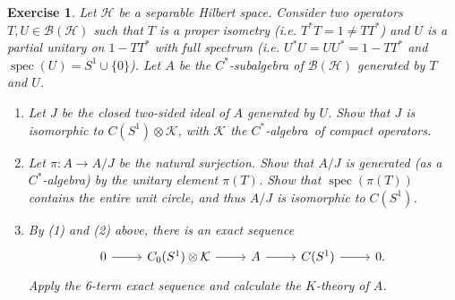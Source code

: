 \documentclass{book}
\newtheorem{exercise}{Exercise}[section]
\def\cstar{\(C^*\)-algebra}
\begin{document}
\begin{exercise}\label{ex:8412}
  Let \(\mathcal{H}\) be a separable Hilbert space. Consider two operators \(T,U\in\mathcal{B}(\mathcal{H})\)
  such that \(T\) is a proper isometry (i.e. \(T^* T=1\neq T T^*\)) and \(U\) is a partial unitary on \(1-T T^*\)
  with full spectrum (i.e. \(U^* U=U U^*=1-T T^*\) and \(\operatorname{spec}(U)=S^1\cup \{0\}\)).
  Let \(A\) be the \(C^*\)-subalgebra of \(\mathcal{B}(\mathcal{H})\) generated by \(T\) and \(U\).
  \begin{enumerate}
    \item Let \(J\) be the closed two-sided ideal of \(A\) generated by \(U\). Show that \(J\) is isomorphic to \(C(S^1)\otimes\mathcal{K}\),
    with \(\mathcal{K}\) the \cstar\ of compact operators.
    \item Let \(\pi:A\rightarrow A/J\) be the natural surjection. Show that \(A/J\) is generated (as a \cstar) by the unitary element \(\pi(T)\).
    Show that \(\operatorname{spec}(\pi(T))\) contains the entire unit circle, and thus \(A/J\) is isomorphic to \(C(S^1)\).
    \item By (1) and (2) above, there is an exact sequence 
    \[
      \begin{tikzcd}
        0\arrow[r]&C_0(S^1)\otimes \mathcal{K}\arrow[r]&A\arrow[r]&C(S^1)\arrow[r]&0.
      \end{tikzcd}
    \]
    Apply the 6-term exact sequence and calculate the \(K\)-theory of \(A\).
  \end{enumerate}
\end{exercise}
\end{document}
